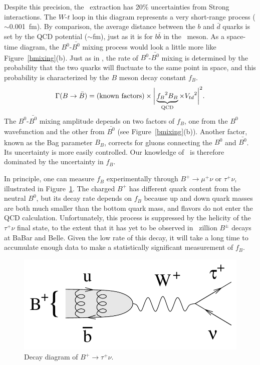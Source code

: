 \documentclass{cornell}
\begin{document}
Despite this precision, the \vtd\ extraction has 20\% uncertainties
from Strong interactions.  The $W$-$t$ loop in this diagram represents
a very short-range process ($\sim$0.001~fm).  By comparison, the
average distance between the $b$ and $\bar{d}$ quarks is set by the
QCD potential ($\sim$fm), just as it is for $b\bar{b}$ in the \ups\
meson.  As a space-time diagram, the $B^0$-$\bar{B^0}$ mixing process
would look a little more like Figure~\ref{bmixing}(b).  Just as in
\gee, the rate of $B^0$-$\bar{B^0}$ mixing is determined by the
probability that the two quarks will fluctuate to the same point in
space, and this probability is characterized by the $B$ meson decay
constant $f_B$.
\begin{equation}
  \Gamma(B \to \bar{B}) = \mbox{(known factors)} \times \bigg|
  \underbrace{{f_B}^2 B_B}_{\mbox{\scriptsize QCD}} \times {V_{td}}^2 \bigg|^2
  \mbox{.}
\end{equation}
The $B^0$-$\bar{B^0}$ mixing amplitude depends on two factors of
$f_B$, one from the $B^0$ wavefunction and the other from $\bar{B^0}$
(see Figure~\ref{bmixing}(b)).  Another factor, known as the Bag
parameter $B_B$, corrects for gluons connecting the $B^0$ and
$\bar{B^0}$.  Its uncertainty is more easily controlled.  Our
knowledge of \vtd\ is therefore dominated by the uncertainty in $f_B$.

In principle, one can measure $f_B$ experimentally through $B^+ \to
\mu^+ \nu$ or $\tau^+ \nu$, illustrated in Figure~\ref{btomunu}.  The
charged $B^+$ has different quark content from the neutral $B^0$, but
its decay rate depends on $f_B$ because up and down quark masses are
both much smaller than the bottom quark mass, and flavors do not enter
the QCD calculation.  Unfortunately, this process is suppressed by the
helicity of the $\tau^+ \nu$ final state, to the extent that it has
yet to be observed in \bork\ zillion $B^\pm$ decays at BaBar and Belle.
Given the low rate of this decay, it will take a long time to
accumulate enough data to make a statistically significant measurement
of $f_B$.

\begin{figure}[p]
  \begin{center}
    \includegraphics[width=0.5\linewidth]{plots/btomunu}
  \end{center}
  \caption{\label{btomunu} Decay diagram of $B^+ \to \tau^+ \nu$.}
\end{figure}
\end{document}
